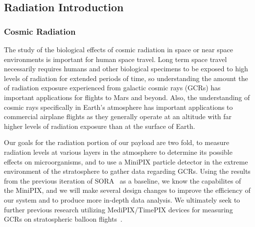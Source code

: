 \subsection{Radiation Introduction}
\label{sec: Radiation Background}

\subsubsection{Cosmic Radiation}
The study of the biological effects of cosmic radiation in space or near space environments is important for human space travel. Long term space travel necessarily requires humans and other biological specimens to be exposed to high levels of radiation for extended periods of time, so understanding the amount the of radiation exposure experienced from galactic cosmic rays (GCRs) has important applications for flights to Mars and beyond. Also, the understanding of cosmic rays specifically in Earth's atmosphere has important applications to commercial airplane flights as they generally operate at an altitude with far higher levels of radiation exposure than at the surface of Earth. 

Our goals for the radiation portion of our payload are two fold, to measure radiation levels at various layers in the atmosphere to determine its possible effects on microorganisms, and to use a MiniPIX particle detector in the extreme environment of the stratosphere to gather data regarding GCRs. Using the results from the previous iteration of SORA~\cite{SORA} as a baseline, we know the capabilites of the MiniPIX, and we will make several design changes to improve the efficiency of our system and to produce more in-depth data analysis. We ultimately seek to further previous research utilizing MediPIX/TimePIX devices for measuring GCRs on stratospheric balloon flights~\cite{bexus}. 



%
%



